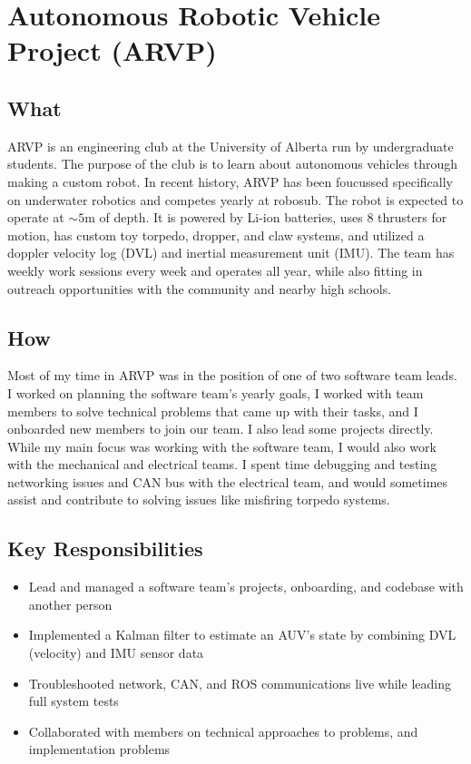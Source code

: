 \documentclass[11pt]{article}
\begin{document}
\section*{Autonomous Robotic Vehicle Project (ARVP)}
\subsection*{What}
ARVP is an engineering club at the University of Alberta run by undergraduate students. The purpose of the club is to learn about autonomous vehicles through making a custom robot. In recent history, ARVP has been foucussed specifically on underwater robotics and competes yearly at robosub. The robot is expected to operate at $\sim 5$m of depth. It is powered by Li-ion batteries, uses $8$ thrusters for motion, has custom toy torpedo, dropper, and claw systems, and utilized a doppler velocity log (DVL) and inertial measurement unit (IMU). The team has weekly work sessions every week and operates all year, while also fitting in outreach opportunities with the community and nearby high schools. 
\subsection*{How}
Most of my time in ARVP was in the position of one of two software team leads. I worked on planning the software team's yearly goals, I worked with team members to solve technical problems that came up with their tasks, and I onboarded new members to join our team. I also lead some projects directly. While my main focus was working with the software team, I would also work with the mechanical and electrical teams. I spent time debugging and testing networking issues and CAN bus with the electrical team, and would sometimes assist and contribute to solving issues like misfiring torpedo systems.    
\subsection*{Key Responsibilities}
\begin{itemize}
    \item Lead and managed a software team's projects, onboarding, and codebase with another person
    \item Implemented a Kalman filter to estimate an AUV's state by combining DVL (velocity) and IMU sensor data 
    \item Troubleshooted network, CAN, and ROS communications live while leading full system tests
    \item Collaborated with members on technical approaches to problems, and implementation problems
\end{itemize}
\end{document}

